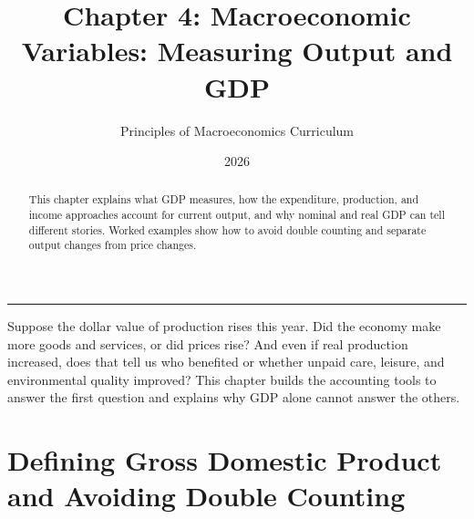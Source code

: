 \documentclass[11pt,letterpaper]{article}
\begin{document}
\title{\Huge\bfseries\color{SlateBlue} Chapter 4: Macroeconomic Variables: Measuring Output and GDP}
\author{\large Principles of Macroeconomics Curriculum}
\date{2026}
\maketitle

\thispagestyle{plain}

\begin{abstract}
This chapter explains what GDP measures, how the expenditure, production, and income approaches account for current output, and why nominal and real GDP can tell different stories. Worked examples show how to avoid double counting and separate output changes from price changes.
\end{abstract}

\tableofcontents
\vspace{1.5em}
\hrule
\vspace{1.5em}

\begin{tcolorbox}[colback=yellow!10!white,colframe=orange!80!black,title=\textbf{Bring It Home: Is a Bigger GDP Always a Better Economy?}]
Suppose the dollar value of production rises this year. Did the economy make more goods and services, or did prices rise? And even if real production increased, does that tell us who benefited or whether unpaid care, leisure, and environmental quality improved? This chapter builds the accounting tools to answer the first question and explains why GDP alone cannot answer the others.
\end{tcolorbox}

\section{Defining Gross Domestic Product and Avoiding Double Counting}
\end{document}
